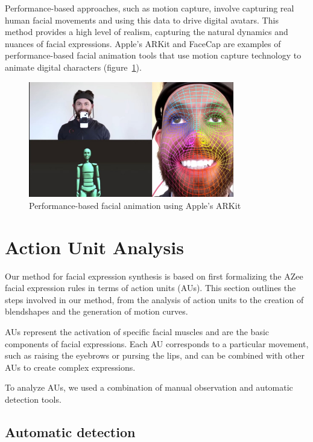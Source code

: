 \documentclass[../../main]{subfiles}
\begin{document}
Performance-based approaches, such as motion capture, involve capturing real human facial movements and using this data to drive digital avatars. This method provides a high level of realism, capturing the natural dynamics and nuances of facial expressions. Apple's ARKit and FaceCap are examples of performance-based facial animation tools that use motion capture technology to animate digital characters (figure~\ref{ch:facial_expressions:fig:motion_capture}).

\begin{figure}
    \centering
    \includegraphics[width=0.8\textwidth]{chapters/facial_expressions/images/motion_capture.jpg}
    \caption{Performance-based facial animation using Apple's ARKit}
    \label{ch:facial_expressions:fig:motion_capture}
\end{figure}

\section{Action Unit Analysis}
\label{ch:facial_expressions:action_unit_analysis}

Our method for facial expression synthesis is based on first formalizing the AZee facial expression rules in terms of action units (AUs). This section outlines the steps involved in our method, from the analysis of action units to the creation of blendshapes and the generation of motion curves.

AUs represent the activation of specific facial muscles and are the basic components of facial expressions. Each AU corresponds to a particular movement, such as raising the eyebrows or pursing the lips, and can be combined with other AUs to create complex expressions.

To analyze AUs, we used a combination of manual observation and automatic detection tools.

\subsection{Automatic detection}
\label{ch:facial_expressions:action_unit_analysis:automatic_detection}
\end{document}

